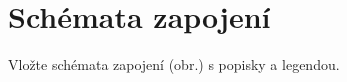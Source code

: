 \chapter{Schémata zapojení}
\label{app:schemata}

Vložte schémata zapojení (obr.) s popisky a legendou.
